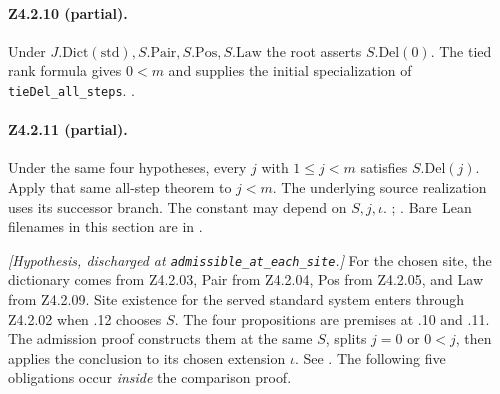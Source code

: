 \paragraph{Z4.2.10 (partial).}\label{r8:Z4.2.10}\label{r8:review:Z4.2.10}
Under $J.\mathrm{Dict}(\mathrm{std}),S.\mathrm{Pair},S.\mathrm{Pos},S.\mathrm{Law}$
the root asserts $S.\mathrm{Del}(0)$.
The tied rank formula gives $0<m$ and supplies the initial specialization
of \nolinkurl{tieDel_all_steps}.
.

\paragraph{Z4.2.11 (partial).}\label{r8:Z4.2.11}\label{r8:review:Z4.2.11}
Under the same four hypotheses, every $j$ with $1\le j<m$ satisfies
$S.\mathrm{Del}(j)$. Apply that same all-step theorem to $j<m$.
The underlying source realization uses its successor branch. The
constant may depend on $S,j,\iota$.
;
.
Bare Lean filenames in this section are in
.

\emph{[Hypothesis, discharged at \nolinkurl{admissible_at_each_site}.]}
For the chosen site, the dictionary comes from Z4.2.03, Pair from Z4.2.04,
Pos from Z4.2.05, and Law from Z4.2.09. Site existence for the served
standard system enters through Z4.2.02 when .12 chooses $S$.
The four propositions are premises at .10 and .11. The admission proof
constructs them at the same $S$, splits $j=0$ or $0<j$, then applies
the conclusion to its chosen extension $\iota$. See
.
The following five obligations occur \emph{inside} the comparison proof.

